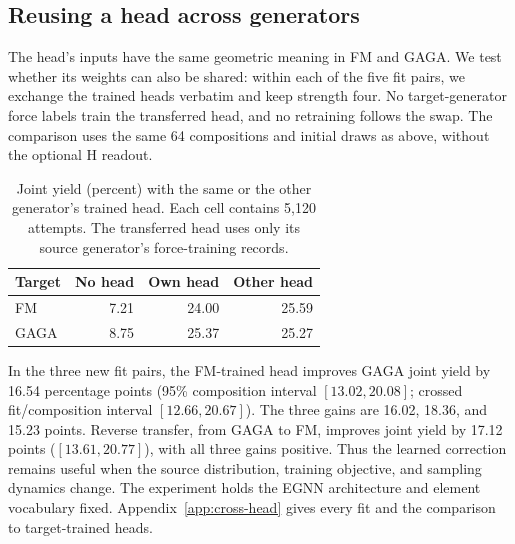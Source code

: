 \subsection{Reusing a head across generators}\label{sec:cross-head}

The head's inputs have the same geometric meaning in FM and GAGA. We test whether
its weights can also be shared: within each of the five fit pairs, we exchange
the trained heads verbatim and keep strength four. No target-generator force
labels train the transferred head, and no retraining follows the swap.
The comparison uses the same 64 compositions and initial draws as above,
without the optional H readout.

\begin{table}[t]\centering\small

\caption{Joint yield (percent) with the same or the other generator's trained head. Each cell contains 5,120 attempts. The transferred head uses only its source generator's force-training records.}

\begin{tabular}{lrrr}\toprule Target & No head & Own head & Other head\\\midrule
FM & 7.21 & 24.00 & 25.59\\
GAGA & 8.75 & 25.37 & 25.27\\
\bottomrule\end{tabular}\label{tab:cross-head}\end{table}

In the three new fit pairs, the FM-trained head improves GAGA joint yield by
16.54 percentage points (95\% composition interval $[13.02,20.08]$;
crossed fit/composition interval $[12.66,20.67]$). The three gains are
16.02, 18.36, and 15.23 points. Reverse transfer, from GAGA to FM, improves
joint yield by 17.12 points ($[13.61,20.77]$), with all three gains positive.
Thus the learned correction remains useful when the source distribution,
training objective, and sampling dynamics change. The experiment holds the
EGNN architecture and element vocabulary fixed.
Appendix~\ref{app:cross-head} gives every fit and the comparison to target-trained heads.
